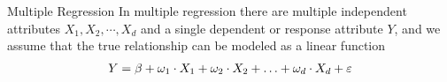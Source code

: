 \ifdefined\wox \begin{frame} \titlepage \end{frame} \fi


\begin{frame}{Multiple Regression}
%
In multiple regression there are multiple independent attributes $X_1,
X_2, \cdots, X_d$ and a single dependent or response attribute $Y$, and
we assume that the true relationship can be modeled as a linear function
\begin{align*}
    Y = \beta + \omega_1 \cdot X_1 + \omega_2 \cdot X_2 + \ldots + \omega_d \cdot X_d +
    \varepsilon
\end{align*}

\medskip

%
%
%

\end{frame}
